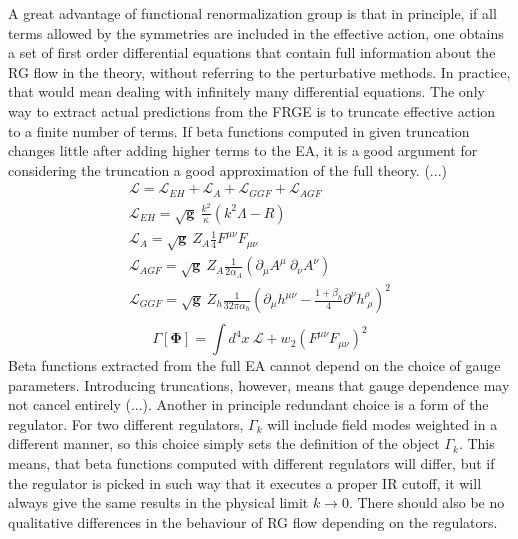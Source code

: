\documentclass[11pt, a4paper]{article}
\begin{document}
A great advantage of functional renormalization group is that in principle, if all terms
allowed by the symmetries are included in the effective action, one obtains a set of first order
differential equations that contain full information about the RG flow in the theory, without referring to the perturbative methods.
In practice, that would mean dealing with infinitely many differential equations. The only way
to extract actual predictions from the FRGE is to truncate effective action to a finite number
of terms. If beta functions computed in given truncation changes little after adding higher terms to the EA,
it is a good argument for considering the truncation a good approximation of the full theory. (...)
\begin{gather}
    \mathcal{L} = \mathcal{L}_{EH} + \mathcal{L}_A + \mathcal{L}_{GGF} + \mathcal{L}_{AGF} \\
    \mathcal{L}_{EH} = \sqrt{\mathbf{g}} \ \frac{k^2}{\kappa} \left( k^2 \Lambda - R\right) \\
    \mathcal{L}_A = \sqrt{\mathbf{g}} \ Z_A \frac{1}{4} F^{\mu\nu} F_{\mu\nu} \\
    \mathcal{L}_{AGF} = \sqrt{\mathbf{g}} \ Z_A \frac{1}{2 \alpha_A} \left( \partial_\mu A^\mu \ \partial_\nu A^\nu \right) \\
    \mathcal{L}_{GGF} = \sqrt{\mathbf{g}} \ Z_h \frac{1}{32 \pi \alpha_h} \left(\partial_\mu h^{\mu\nu} - \frac{1+\beta_h}{4} \partial^\nu h^\rho_{\; \rho} \right)^2\\
\end{gather}
\begin{equation}
    \Gamma[\mathbf{\Phi}] = \int d^4 x \ \mathcal{L} + w_2 (F^{\mu\nu} F_{\mu\nu})^2
\end{equation}
Beta functions extracted from the full EA cannot depend on the choice of gauge parameters.
Introducing truncations, however, means that gauge dependence may not cancel entirely (...).
Another in principle redundant choice is a form of the regulator. For two different regulators,
$\Gamma_k$ will include field modes weighted in a different manner, so this choice simply
sets the definition of the object $\Gamma_k$. 
This means, that beta functions computed with different regulators will differ, but
if the regulator is picked in such way that it executes a proper IR cutoff,
it will always give the same results in the physical limit $k \rightarrow 0$. There should also be no
qualitative differences in the behaviour of RG flow depending on the regulators.
\end{document}
